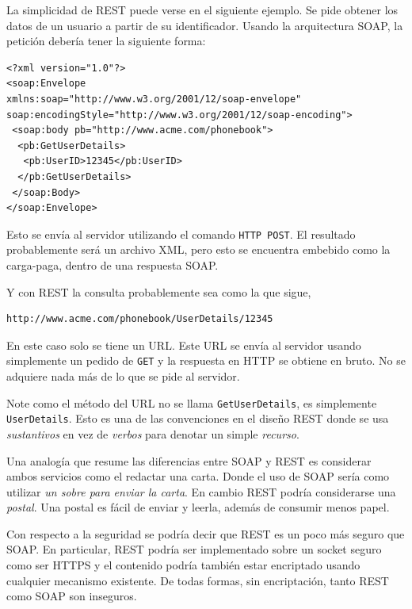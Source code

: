 \documentclass[conference]{IEEEtran}
\begin{document}

La simplicidad de REST puede verse en el siguiente ejemplo. Se pide
obtener los datos de un usuario a partir de su identificador.
Usando la arquitectura SOAP, la petición debería tener la siguiente
forma:
\begin{lstlisting}[frame=single]
<?xml version="1.0"?>
<soap:Envelope
xmlns:soap="http://www.w3.org/2001/12/soap-envelope"
soap:encodingStyle="http://www.w3.org/2001/12/soap-encoding">
 <soap:body pb="http://www.acme.com/phonebook">
  <pb:GetUserDetails>
   <pb:UserID>12345</pb:UserID>
  </pb:GetUserDetails>
 </soap:Body>
</soap:Envelope>
\end{lstlisting}

Esto se envía al servidor utilizando el comando \texttt{HTTP POST}. El
resultado probablemente será un archivo XML, pero esto
se encuentra embebido como la carga-paga, dentro de una respuesta
SOAP.

Y con REST la consulta probablemente sea como la que sigue,
\begin{lstlisting}[frame=single]
http://www.acme.com/phonebook/UserDetails/12345
\end{lstlisting}

En este caso solo se tiene un URL. Este URL se envía al servidor
usando simplemente un pedido de \texttt{GET} y la respuesta en HTTP se
obtiene en bruto. No se adquiere nada más de lo que se pide al
servidor. 

Note como el método del URL no se llama \texttt{GetUserDetails}, es
simplemente \texttt{UserDetails}. Esto es una de las convenciones en
el diseño REST donde se usa  \emph{sustantivos} en vez de
\emph{verbos} para denotar un simple \emph{recurso}.

Una analogía que resume las diferencias entre SOAP y REST es
considerar ambos servicios como el redactar una carta. Donde el uso de
SOAP sería como utilizar \emph{un sobre para enviar la carta}. En
cambio REST podría considerarse una \emph{postal}. Una postal es fácil
de enviar y leerla, además de consumir menos papel.

Con respecto a la seguridad se podría decir que REST es un poco más
seguro que SOAP. En particular, REST podría ser implementado sobre un
socket seguro como ser HTTPS y el contenido podría también estar
encriptado usando cualquier mecanismo existente. De todas formas, sin
encriptación, tanto REST como SOAP son inseguros. 
\end{document}
